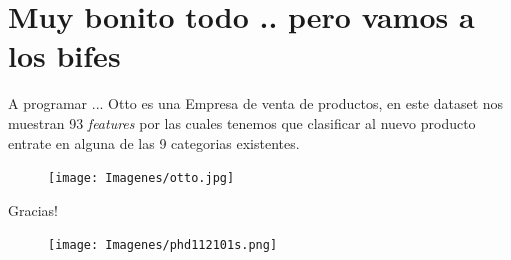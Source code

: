 \documentclass[bigger]{beamer}
\begin{document}
\section{Muy bonito todo .. pero vamos a los bifes}
\begin{frame}{A programar ...}
Otto es una Empresa de venta de productos, en este dataset nos muestran 93 \emph{features} por las cuales tenemos que clasificar al nuevo producto entrate en alguna de las 9 categorias existentes.
 \begin{figure}[h]
        \texttt{[image: Imagenes/otto.jpg]}
\end{figure}
\end{frame}

\begin{frame}{Gracias!}
 \begin{figure}[h]
        \texttt{[image: Imagenes/phd112101s.png]}
\end{figure}

\end{frame}
\end{document}
